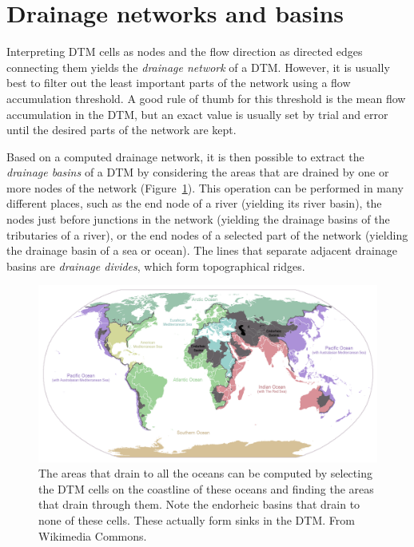 \section{Drainage networks and basins}

Interpreting DTM cells as nodes and the flow direction as directed edges connecting them yields the \emph{drainage network} of a DTM\@.
However, it is usually best to filter out the least important parts of the network using a flow accumulation threshold.
A good rule of thumb for this threshold is the mean flow accumulation in the DTM, but an exact value is usually set by trial and error until the desired parts of the network are kept.

Based on a computed drainage network, it is then possible to extract the \emph{drainage basins} of a DTM by considering the areas that are drained by one or more nodes of the network (Figure~\ref{fig:oceans}).
This operation can be performed in many different places, such as the end node of a river (yielding its river basin), the nodes just before junctions in the network (yielding the drainage basins of the tributaries of a river), or the end nodes of a selected part of the network (yielding the drainage basin of a sea or ocean).
The lines that separate adjacent drainage basins are \emph{drainage divides}, which form topographical ridges.

\begin{figure}[htbp]
\centering
\includegraphics[width=\linewidth]{figs/Ocean_drainage}
\caption{The areas that drain to all the oceans can be computed by selecting the DTM cells on the coastline of these oceans and finding the areas that drain through them.
Note the endorheic basins that drain to none of these cells.
These actually form sinks in the DTM\@.
From Wikimedia Commons.}%
\label{fig:oceans}
\end{figure}

